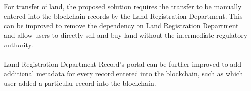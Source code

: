 \documentclass{article}
\begin{document}
            \paragraph{}
            For transfer of land, the proposed solution requires the transfer to be manually entered into the blockchain records by the Land Registration Department. This can be improved to remove the dependency on Land Registration Department and allow users to directly sell and buy land without the intermediate regulatory authority.

            \paragraph{}
            Land Registration Department Record's portal can be further improved to add additional metadata for every record entered into the blockchain, such as which user added a particular record into the blockchain.
        
    \printglossaries
    \clearpage
    
    
\end{document}
